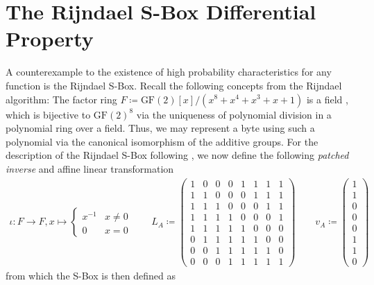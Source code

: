 \documentclass[10pt]{amsart}
\theoremstyle{definition}
\theoremstyle{remark}
\begin{document}
    \section{The Rijndael S-Box Differential Property} A counterexample to the existence of high probability characteristics for any function is the Rijndael S-Box. Recall the following concepts from the Rijndael algorithm: The factor ring \(F \coloneqq \text{GF}(2)[x]/(x^8+x^4+x^3+x+1)\) \cite[pp. 10-11]{Dworkin_2023} is a field \cite[pp. 313-314]{Fischer}, which is bijective to \(\text{GF}(2)^8\) via the uniqueness of polynomial division in a polynomial ring over a field. Thus, we may represent a byte using such a polynomial via the canonical isomorphism of the additive groups. For the description of the Rijndael S-Box following \cite[pp. 15-16]{Dworkin_2023}, we now define the following \emph{patched inverse} and affine linear transformation
    \begin{align}
        \iota\colon F \to F, x \mapsto \begin{cases}
            x^{-1} & x \neq 0\\
            0 & x = 0
        \end{cases} \qquad L_A\coloneqq \begin{pmatrix}
            1 & 0 & 0 & 0 & 1 & 1 & 1 & 1\\
            1 & 1 & 0 & 0 & 0 & 1 & 1 & 1\\
            1 & 1 & 1 & 0 & 0 & 0 & 1 & 1\\
            1 & 1 & 1 & 1 & 0 & 0 & 0 & 1\\
            1 & 1 & 1 & 1 & 1 & 0 & 0 & 0\\
            0 & 1 & 1 & 1 & 1 & 1 & 0 & 0\\
            0 & 0 & 1 & 1 & 1 & 1 & 1 & 0\\
            0 & 0 & 0 & 1 & 1 & 1 & 1 & 1
        \end{pmatrix} \qquad v_A \coloneqq \begin{pmatrix}
            1\\
            1\\
            0\\
            0\\
            0\\
            1\\
            1\\
            0
        \end{pmatrix}
    \end{align}
    from which the S-Box is then defined as
\end{document}
